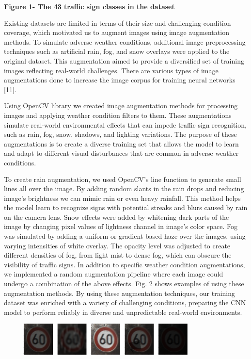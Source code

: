 {\bfseries Figure 1- The 43 traffic sign classes in the dataset}

Existing datasets are limited in terms of their size and challenging
condition coverage, which motivated us to augment images using image
augmentation methods. To simulate adverse weather conditions, additional
image preprocessing techniques such as artificial rain, fog, and snow
overlays were applied to the original dataset. This augmentation aimed
to provide a diversified set of training images reflecting real-world
challenges. There are various types of image augmentations done to
increase the image corpus for training neural networks {[}11{]}.

Using OpenCV library we created image augmentation methods for
processing images and applying weather condition filters to them. These
augmentations simulate real-world environmental effects that can impede
traffic sign recognition, such as rain, fog, snow, shadows, and lighting
variations. The purpose of these augmentations is to create a diverse
training set that allows the model to learn and adapt to different
visual disturbances that are common in adverse weather conditions.

To create rain augmentation, we used OpenCV's line function to generate
small lines all over the image. By adding random slants in the rain
drops and reducing image's brightness we can mimic rain or even heavy
rainfall. This method helps the model learn to recognize signs with
potential streaks and blurs caused by rain on the camera lens. Snow
effects were added by whitening dark parts of the image by changing
pixel values of lightness channel in image's color space. Fog was
simulated by adding a uniform or gradient-based haze over the images,
using varying intensities of white overlay. The opacity level was
adjusted to create different densities of fog, from light mist to dense
fog, which can obscure the visibility of traffic signs. In addition to
specific weather condition augmentations, we implemented a random
augmentation pipeline where each image could undergo a combination of
the above effects. Fig. 2 shows examples of using these augmentation
methods. By using these augmentation techniques, our training dataset
was enriched with a variety of challenging conditions, preparing the CNN
model to perform reliably in diverse and unpredictable real-world
environments.

\begin{figure}[H]
	\centering
	\includegraphics[width=0.8\textwidth]{assets/58}
	\caption*{}
\end{figure}

